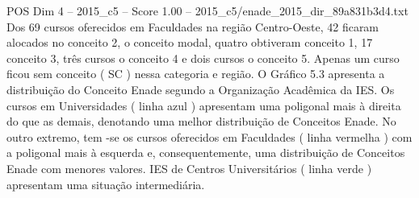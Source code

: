 \begin{textsample}{POS Dim 4 – 2015\_c5 – Score 1.00 – 2015\_c5/enade\_2015\_dir\_89a831b3d4.txt}
Dos 69 cursos oferecidos em Faculdades na região Centro-Oeste, 42 ficaram alocados no conceito 2, o conceito modal, quatro obtiveram conceito 1, 17 conceito 3, três cursos o conceito 4 e dois cursos o conceito 5.
Apenas um curso ficou sem conceito ( SC ) nessa categoria e região.
O Gráfico 5.3 apresenta a distribuição do Conceito Enade segundo a Organização Acadêmica da IES.
Os cursos em Universidades ( linha azul ) apresentam uma poligonal mais à direita do que as demais, denotando uma melhor distribuição de Conceitos Enade.
No outro extremo, tem -se os cursos oferecidos em Faculdades ( linha vermelha ) com a poligonal mais à esquerda e, consequentemente, uma distribuição de Conceitos Enade com menores valores.
IES de Centros Universitários ( linha verde ) apresentam uma situação intermediária.

\end{textsample}
